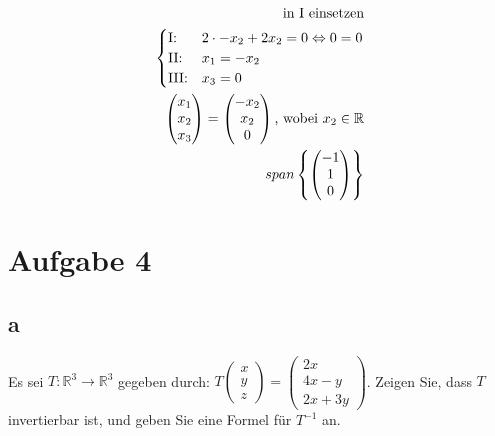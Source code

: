 \begin{align*}
    \text{in I einsetzen}                                                       \\\pagebreak[0]
    \begin{cases}
        \text{I:\@}   & 2 \cdot -x_2 + 2x_2 = 0 \Leftrightarrow 0 = 0 \\
        \text{II:\@}  & x_1 = -x_2                                    \\
        \text{III:\@} & x_3 = 0
    \end{cases}               \\\pagebreak[0]
    \begin{pmatrix}
        x_1 \\ x_2 \\ x_3
    \end{pmatrix} = \begin{pmatrix}
                        -x_2 \\ x_2 \\ 0
                    \end{pmatrix} \text{, wobei } x_2 \in \mathbb{R}            \\
    span\left\{\begin{pmatrix}
                   -1 \\ 1 \\ 0
               \end{pmatrix}\right\}
\end{align*}

\section{Aufgabe 4}

\subsection{a}
Es sei $T: \mathbb{R}^3 \rightarrow \mathbb{R}^3$ gegeben durch: $T \begin{pmatrix} x \\ y \\ z \end{pmatrix} = \begin{pmatrix}2x \\ 4x-y \\ 2x+3y\end{pmatrix}$. Zeigen Sie, dass $T$ invertierbar ist, und geben Sie eine Formel für $T^{-1}$ an.

